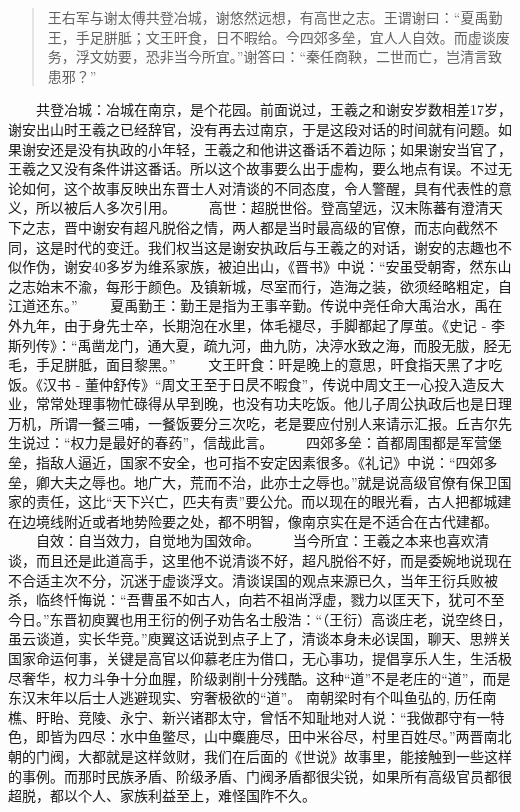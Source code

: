 \documentclass[]{book}
\begin{document}
\begin{quote}
王右军与谢太傅共登冶城，谢悠然远想，有高世之志。王谓谢曰：``夏禹勤王，手足胼胝；文王旰食，日不暇给。今四郊多垒，宜人人自效。而虚谈废务，浮文妨要，恐非当今所宜。''谢答曰：``秦任商鞅，二世而亡，岂清言致患邪？''
\end{quote}

　　共登冶城：冶城在南京，是个花园。前面说过，王羲之和谢安岁数相差17岁，谢安出山时王羲之已经辞官，没有再去过南京，于是这段对话的时间就有问题。如果谢安还是没有执政的小年轻，王羲之和他讲这番话不着边际；如果谢安当官了，王羲之又没有条件讲这番话。所以这个故事要么出于虚构，要么地点有误。不过无论如何，这个故事反映出东晋士人对清谈的不同态度，令人警醒，具有代表性的意义，所以被后人多次引用。
　　高世：超脱世俗。登高望远，汉末陈蕃有澄清天下之志，晋中谢安有超凡脱俗之情，两人都是当时最高级的官僚，而志向截然不同，这是时代的变迁。我们权当这是谢安执政后与王羲之的对话，谢安的志趣也不似作伪，谢安40多岁为维系家族，被迫出山，《晋书》中说：``安虽受朝寄，然东山之志始末不渝，每形于颜色。及镇新城，尽室而行，造海之装，欲须经略粗定，自江道还东。''
　　夏禹勤王：勤王是指为王事辛勤。传说中尧任命大禹治水，禹在外九年，由于身先士卒，长期泡在水里，体毛褪尽，手脚都起了厚茧。《史记
-
李斯列传》：``禹凿龙门，通大夏，疏九河，曲九防，决渟水致之海，而股无胈，胫无毛，手足胼胝，面目黎黑。''
　　文王旰食：旰是晚上的意思，旰食指天黑了才吃饭。《汉书 -
董仲舒传》``周文王至于日昃不暇食''，传说中周文王一心投入造反大业，常常处理事物忙碌得从早到晚，也没有功夫吃饭。他儿子周公执政后也是日理万机，所谓一餐三哺，一餐饭要分三次吃，老是要应付别人来请示汇报。丘吉尔先生说过：``权力是最好的春药''，信哉此言。
　　四郊多垒：首都周围都是军营堡垒，指敌人逼近，国家不安全，也可指不安定因素很多。《礼记》中说：``四郊多垒，卿大夫之辱也。地广大，荒而不治，此亦士之辱也。''就是说高级官僚有保卫国家的责任，这比``天下兴亡，匹夫有责''要公允。而以现在的眼光看，古人把都城建在边境线附近或者地势险要之处，都不明智，像南京实在是不适合在古代建都。
　　自效：自当效力，自觉地为国效命。
　　当今所宜：王羲之本来也喜欢清谈，而且还是此道高手，这里他不说清谈不好，超凡脱俗不好，而是委婉地说现在不合适主次不分，沉迷于虚谈浮文。清谈误国的观点来源已久，当年王衍兵败被杀，临终忏悔说：``吾曹虽不如古人，向若不祖尚浮虚，戮力以匡天下，犹可不至今日。''东晋初庾翼也用王衍的例子劝告名士殷浩：``（王衍）高谈庄老，说空终日，虽云谈道，实长华竞。''庾翼这话说到点子上了，清谈本身未必误国，聊天、思辨关国家命运何事，关键是高官以仰慕老庄为借口，无心事功，提倡享乐人生，生活极尽奢华，权力斗争十分血腥，阶级剥削十分残酷。这种``道''不是老庄的``道''，而是东汉末年以后士人逃避现实、穷奢极欲的``道''。
南朝梁时有个叫鱼弘的,
历任南樵、盱眙、竞陵、永宁、新兴诸郡太守，曾恬不知耻地对人说：``我做郡守有一特色，即皆为四尽：水中鱼鳖尽，山中麋鹿尽，田中米谷尽，村里百姓尽。''两晋南北朝的门阀，大都就是这样敛财，我们在后面的《世说》故事里，能接触到一些这样的事例。而那时民族矛盾、阶级矛盾、门阀矛盾都很尖锐，如果所有高级官员都很超脱，都以个人、家族利益至上，难怪国阼不久。
\end{document}
